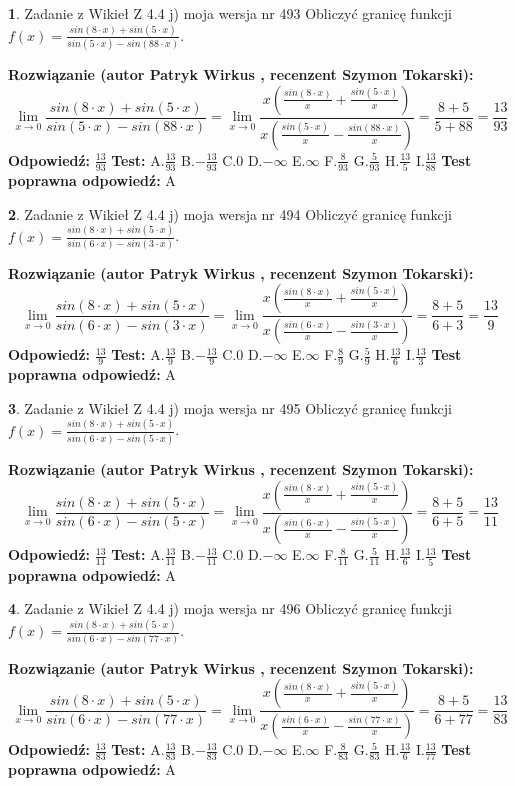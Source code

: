 \documentclass[12pt, a4paper]{article}
\theoremstyle{definition} %
\newtheorem{zad}{}
\newcommand{\zadStart}[1]{\begin{zad}#1\newline}
\newcommand{\zadStop}{\end{zad}}
\newcommand{\rozwStart}[2]{\noindent \textbf{Rozwiązanie (autor #1 , recenzent #2): }\newline}
\newcommand{\rozwStop}{\newline}
\newcommand{\odpStart}{\noindent \textbf{Odpowiedź:}\newline}
\newcommand{\odpStop}{\newline}
\newcommand{\testStart}{\noindent \textbf{Test:}\newline}
\newcommand{\testStop}{\newline}
\newcommand{\kluczStart}{\noindent \textbf{Test poprawna odpowiedź:}\newline}
\newcommand{\kluczStop}{\newline}
\begin{document}
\zadStart{Zadanie z Wikieł Z 4.4 j) moja wersja nr 493}
Obliczyć granicę funkcji $f(x)=\frac{sin(8\cdot x) +sin(5\cdot x)}{sin(5\cdot x) -sin(88\cdot x)}$.
\zadStop
\rozwStart{Patryk Wirkus}{Szymon Tokarski}
$$\lim\limits_{x\to 0}\frac{sin(8\cdot x) +sin(5\cdot x)}{sin(5\cdot x) -sin(88\cdot x)}=\lim\limits_{x\to 0}\frac{x(\frac{sin(8\cdot x)}{x}+\frac{sin(5\cdot x)}{x})}{x(\frac{sin(5\cdot x)}{x}-\frac{sin(88\cdot x)}{x})}=\frac{8+5}{5+88} = \frac{13}{93}$$
\rozwStop
\odpStart
$\frac{13}{93}$
\odpStop
\testStart
A.$\frac{13}{93}$
B.$-\frac{13}{93}$
C.$0$
D.$-\infty$
E.$\infty$
F.$\frac{8}{93}$
G.$\frac{5}{93}$
H.$\frac{13}{5}$
I.$\frac{13}{88}$
\testStop
\kluczStart
A
\kluczStop



\zadStart{Zadanie z Wikieł Z 4.4 j) moja wersja nr 494}
Obliczyć granicę funkcji $f(x)=\frac{sin(8\cdot x) +sin(5\cdot x)}{sin(6\cdot x) -sin(3\cdot x)}$.
\zadStop
\rozwStart{Patryk Wirkus}{Szymon Tokarski}
$$\lim\limits_{x\to 0}\frac{sin(8\cdot x) +sin(5\cdot x)}{sin(6\cdot x) -sin(3\cdot x)}=\lim\limits_{x\to 0}\frac{x(\frac{sin(8\cdot x)}{x}+\frac{sin(5\cdot x)}{x})}{x(\frac{sin(6\cdot x)}{x}-\frac{sin(3\cdot x)}{x})}=\frac{8+5}{6+3} = \frac{13}{9}$$
\rozwStop
\odpStart
$\frac{13}{9}$
\odpStop
\testStart
A.$\frac{13}{9}$
B.$-\frac{13}{9}$
C.$0$
D.$-\infty$
E.$\infty$
F.$\frac{8}{9}$
G.$\frac{5}{9}$
H.$\frac{13}{6}$
I.$\frac{13}{3}$
\testStop
\kluczStart
A
\kluczStop



\zadStart{Zadanie z Wikieł Z 4.4 j) moja wersja nr 495}
Obliczyć granicę funkcji $f(x)=\frac{sin(8\cdot x) +sin(5\cdot x)}{sin(6\cdot x) -sin(5\cdot x)}$.
\zadStop
\rozwStart{Patryk Wirkus}{Szymon Tokarski}
$$\lim\limits_{x\to 0}\frac{sin(8\cdot x) +sin(5\cdot x)}{sin(6\cdot x) -sin(5\cdot x)}=\lim\limits_{x\to 0}\frac{x(\frac{sin(8\cdot x)}{x}+\frac{sin(5\cdot x)}{x})}{x(\frac{sin(6\cdot x)}{x}-\frac{sin(5\cdot x)}{x})}=\frac{8+5}{6+5} = \frac{13}{11}$$
\rozwStop
\odpStart
$\frac{13}{11}$
\odpStop
\testStart
A.$\frac{13}{11}$
B.$-\frac{13}{11}$
C.$0$
D.$-\infty$
E.$\infty$
F.$\frac{8}{11}$
G.$\frac{5}{11}$
H.$\frac{13}{6}$
I.$\frac{13}{5}$
\testStop
\kluczStart
A
\kluczStop



\zadStart{Zadanie z Wikieł Z 4.4 j) moja wersja nr 496}
Obliczyć granicę funkcji $f(x)=\frac{sin(8\cdot x) +sin(5\cdot x)}{sin(6\cdot x) -sin(77\cdot x)}$.
\zadStop
\rozwStart{Patryk Wirkus}{Szymon Tokarski}
$$\lim\limits_{x\to 0}\frac{sin(8\cdot x) +sin(5\cdot x)}{sin(6\cdot x) -sin(77\cdot x)}=\lim\limits_{x\to 0}\frac{x(\frac{sin(8\cdot x)}{x}+\frac{sin(5\cdot x)}{x})}{x(\frac{sin(6\cdot x)}{x}-\frac{sin(77\cdot x)}{x})}=\frac{8+5}{6+77} = \frac{13}{83}$$
\rozwStop
\odpStart
$\frac{13}{83}$
\odpStop
\testStart
A.$\frac{13}{83}$
B.$-\frac{13}{83}$
C.$0$
D.$-\infty$
E.$\infty$
F.$\frac{8}{83}$
G.$\frac{5}{83}$
H.$\frac{13}{6}$
I.$\frac{13}{77}$
\testStop
\kluczStart
A
\kluczStop
\end{document}
